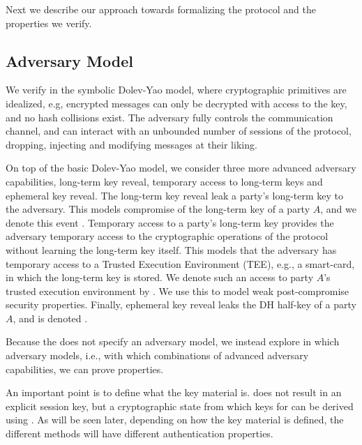 Next we describe our approach towards formalizing the \mEdhoc{} protocol and the
properties we verify.
%

\subsection{Adversary Model}\label{sec:threat-model}
We verify \mEdhoc{} in the symbolic Dolev-Yao model, where
cryptographic primitives are idealized, e.g, encrypted messages can only be
decrypted with access to the key, and no hash collisions exist.
%
The adversary fully controls the
communication channel, and can interact with an unbounded number of sessions
of the protocol, dropping, injecting and modifying messages at their liking.
%

On top of the basic Dolev-Yao model, we consider three more advanced
adversary capabilities, long-term key reveal, temporary access to long-term
keys and ephemeral key reveal.
%
The long-term key reveal leak a party's long-term key to the adversary.
%
This models compromise of the long-term key of a party $A$, and we denote this
event .
%
Temporary access to a party's long-term key provides the adversary temporary
access to the cryptographic operations of the protocol without learning the
long-term key itself.
%
This models that the adversary has temporary access to a Trusted Execution
Environment (TEE), e.g., a smart-card, in which the long-term key is stored.
%
We denote such an access to party $A$'s trusted execution environment by
.
%
We use this to model weak post-compromise security properties.
%
Finally, ephemeral key reveal leaks the DH half-key of a party $A$, and is
denoted .
%

Because the \mSpec{} does not specify an adversary model, we instead explore
in which adversary models, i.e., with which combinations of advanced adversary
capabilities, we can prove properties.
%

An important point is to define what the key material is.
    \mEdhoc{} does not result in an explicit session key, but a cryptographic
    state from which keys for \mOscore{} can be derived using \mHkdf.
    As will be seen later, depending on how the key material is defined, the
    different methods will have different authentication properties.

